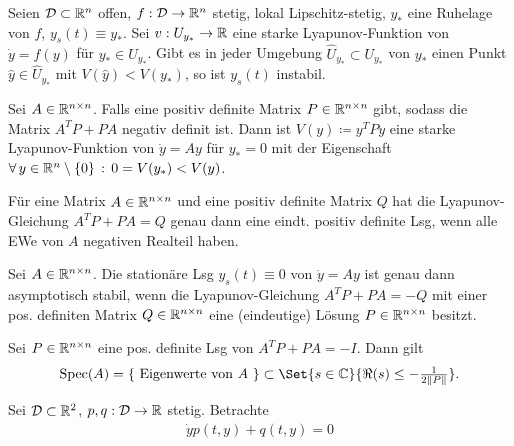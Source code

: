\documentclass{cheat-sheet}
\newcommand{\D}{\mathcal{D}}
\DeclareMathOperator{\Spec}{Spec} %
\begin{document}
\begin{satz}
  Seien $\D \subset \R^n$ offen, $f : \D \to \R^n$ stetig, lokal Lipschitz-stetig, $y_{*}$ eine Ruhelage von $f$, $y_s(t) \equiv y_{*}$. Sei $v : U_{y_{*}} \to \mathbb{R}$ eine starke Lyapunov-Funktion von $\dot{y} = f(y)$ für $y_{*} \in U_{y_{*}}$. Gibt es in jeder Umgebung $\widehat{U}_{y_{*}} \subset U_{y_{*}}$ von $y_{*}$ einen Punkt $\hat{y} \in \widehat{U}_{y_*}$ mit $V(\hat{y}) < V(y_*)$, so ist $y_s(t)$ instabil.
\end{satz}


\begin{satz}
  Sei $A \in \mathbb{R}^{n \times n}$. Falls eine positiv definite Matrix $P \in \mathbb{R}^{n \times n}$ gibt, sodass die Matrix $A^T P + PA$ negativ definit ist. Dann ist $V(y) \coloneqq y^T P y$ eine starke Lyapunov-Funktion von $\dot{y} = Ay$ für $y_{*} = 0$ mit der Eigenschaft $\forall \, {y \in \mathbb{R}^n \setminus \{ 0 \}} \,:\, 0 = V(y_*) < V(y)$.
\end{satz}

\begin{satz}
  Für eine Matrix $A \in \mathbb{R}^{n \times n}$ und eine positiv definite Matrix $Q$ hat die Lyapunov-Gleichung $A^T P + PA = Q$ genau dann eine eindt. positiv definite Lsg, wenn alle EWe von $A$ negativen Realteil haben.
\end{satz}

\begin{kor}
  Sei $A \in \mathbb{R}^{n \times n}$. Die stationäre Lsg $y_s(t) \equiv 0$ von $\dot{y} = Ay$ ist genau dann asymptotisch stabil, wenn die Lyapunov-Gleichung $A^T P + PA = - Q$ mit einer pos. definiten Matrix $Q \in \mathbb{R}^{n \times n}$ eine (eindeutige) Lösung $P \in \mathbb{R}^{n \times n}$ besitzt.
\end{kor}

\begin{satz}
  Sei $P \in \mathbb{R}^{n \times n}$ eine pos. definite Lsg von $A^T P + PA = -I$. Dann gilt
  \[ \Spec(A) = \{ \text{ Eigenwerte von $A$ } \} \subset \Set{s \in \C}{\Re(s) \leq - \tfrac{1}{2 \norm{P}}}. \]
\end{satz}


\begin{prob}
  Sei $\D \subset \R^2$, $p, q : \D \to \R$ stetig. Betrachte
  \begin{align*}
    \dot{y} p(t, y) + q(t, y) = 0 \tag{5.1}
  \end{align*}
\end{prob}
\end{document}
